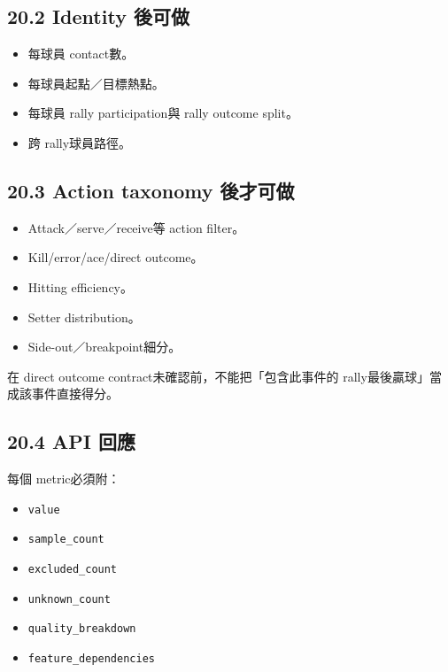 \documentclass[
  9pt,
  a4paper,
]{article}
\providecommand{\tightlist}{%
  \setlength{\itemsep}{0pt}\setlength{\parskip}{0pt}}
\begin{document}
\subsection{20.2 Identity 後可做}\label{202-identity-ux5f8cux53efux505a}

\begin{itemize}
\tightlist
\item
  每球員 contact數。
\item
  每球員起點／目標熱點。
\item
  每球員 rally participation與 rally outcome split。
\item
  跨 rally球員路徑。
\end{itemize}

\subsection{20.3 Action taxonomy
後才可做}\label{203-action-taxonomy-ux5f8cux624dux53efux505a}

\begin{itemize}
\tightlist
\item
  Attack／serve／receive等 action filter。
\item
  Kill/error/ace/direct outcome。
\item
  Hitting efficiency。
\item
  Setter distribution。
\item
  Side-out／breakpoint細分。
\end{itemize}

在 direct outcome contract未確認前，不能把「包含此事件的
rally最後贏球」當成該事件直接得分。

\subsection{20.4 API 回應}\label{204-api-ux56deux61c9}

每個 metric必須附：

\begin{itemize}
\tightlist
\item
  \texttt{value}
\item
  \texttt{sample\_\allowbreak{}count}
\item
  \texttt{excluded\_\allowbreak{}count}
\item
  \texttt{unknown\_\allowbreak{}count}
\item
  \texttt{quality\_\allowbreak{}breakdown}
\item
  \texttt{feature\_\allowbreak{}dependencies}
\end{itemize}
\end{document}
